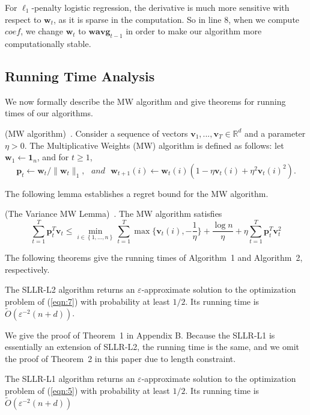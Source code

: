 \documentclass{llncs}
\newcommand{\bw}{\mathbf{w}}
\newcommand{\bwavg}{\mathbf{wavg}}
\newcommand{\bp}{\mathbf{p}}
\newcommand{\sumt}{\sum_{t=1}^{T} }
\newcommand{\lc}{\left(}
\newcommand{\rc}{\right)}
\begin{document}
	For $\ell_1$-penalty logistic regression, the derivative is much more sensitive with respect to $\bw_t$, as it is sparse in the computation. So in line 8, when we compute $coef$, we change $\bw_t$ to $\bwavg_{t-1}$ in order to make our algorithm more computationally stable.
	
\subsection{Running Time Analysis}
	
	We now formally describe the MW algorithm and give theorems for running times of our algorithms.
	
	\begin{definition}
	(MW algorithm)~\cite{clarkson2010sublinear}. Consider a sequence of vectors $\mathbf{v}_1,...,\mathbf{v}_T\in\mathbb{R}^d$ and a parameter $\eta>0$. The Multiplicative Weights (MW) algorithm is defined as follows: let $\bw_1 \leftarrow \mathbf{1}_n$, and for $t\geq 1$,
	\[
	\bp_t \leftarrow \bw_t/\|\bw_t\|_1, \,\,\,\, and \,\,\,\, \bw_{t+1}(i) \leftarrow \bw_t(i)\lc 1-\eta\mathbf{v}_t(i)+\eta^2\mathbf{v}_t(i)^2 \rc.
	\]
	\end{definition}
	
	The following lemma establishes a regret bound for the MW algorithm.
	
	\begin{lemma} \label{lem:2}
	(The Variance MW Lemma)~\cite{clarkson2010sublinear}. The MW algorithm satisfies
	\[
	\sumt \bp_t^T\mathbf{v}_t \leq \min_{i\in\left\{1,...,n\right\} } \sumt \max\{\mathbf{v}_t(i),-\frac{1}{\eta}\}+\frac{\log n}{\eta}+\eta\sumt\bp_t^T \mathbf{v}_t^2
	\]
	\end{lemma}
	
The following theorems give the running times of Algorithm~1 and Algorithm~2, respectively.
	
	\begin{theorem}
	The SLLR-L2 algorithm returns an $\varepsilon$-approximate solution to the optimization problem of (\ref{eqn:7}) with probability at least $1/2$. Its running time is $ \tilde{O}\lc \varepsilon^{-2}\lc n+d\rc \rc $.
	\end{theorem}
	
	We give the proof of Theorem~1 in Appendix B. Because the SLLR-L1 is essentially an extension of SLLR-L2, the running time is the same, and we omit the proof of Theorem~2 in this paper due to length constraint.
	
	\begin{theorem}
	The SLLR-L1 algorithm returns an $\varepsilon$-approximate solution to the optimization problem of (\ref{eqn:5}) with probability at least $1/2$. Its running time is $ \tilde{O}\lc \varepsilon^{-2}\lc n+d\rc \rc $
	\end{theorem}
	
\end{document}
